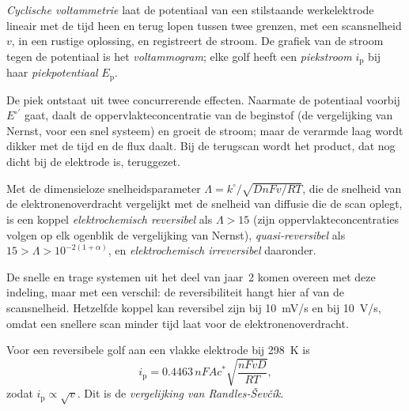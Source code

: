 \begin{definition}\label{def:b3:electrode-kinetics:cv}
\emph{Cyclische voltammetrie} laat de
potentiaal van een stilstaande werkelektrode lineair met de tijd heen en
terug lopen tussen twee grenzen, met een scansnelheid $v$, in een rustige
oplossing, en registreert de stroom. De grafiek van de stroom tegen de
potentiaal is het \emph{voltammogram}; elke golf heeft
een \emph{piekstroom} $i_{\mathrm p}$ bij haar
\emph{piekpotentiaal}
$E_{\mathrm p}$.
\end{definition}

De piek ontstaat uit twee concurrerende effecten. Naarmate de potentiaal
voorbij $E^{\circ\prime}$ gaat, daalt de oppervlakteconcentratie van de
beginstof (de vergelijking van Nernst, voor een snel systeem) en groeit
de stroom; maar de verarmde laag wordt dikker met de tijd en de flux
daalt. Bij de terugscan wordt het product, dat nog dicht bij de
elektrode is, teruggezet.

\begin{definition}[Reversibiliteit]\label{def:b3:electrode-kinetics:reversibility}
Met de dimensieloze snelheidsparameter $\Lambda = k^\circ/\sqrt{DnFv/RT}$,
die de snelheid van de elektronenoverdracht vergelijkt met de snelheid
van diffusie die de scan oplegt, is een koppel
\emph{elektrochemisch reversibel}
als $\Lambda > 15$ (zijn oppervlakteconcentraties volgen op elk ogenblik de
vergelijking van Nernst),
\emph{quasi-reversibel} als $15 >
\Lambda > 10^{-2(1 + \alpha)}$, en
\emph{elektrochemisch irreversibel}
daaronder.
\end{definition}

\begin{remark}
De snelle en trage systemen uit het deel van jaar~2 komen overeen met deze
indeling, maar met een verschil: de reversibiliteit hangt hier af van de
scansnelheid. Hetzelfde koppel kan reversibel zijn bij \qty{10}{mV/s} en
 bij
\qty{10}{V/s}, omdat een snellere scan minder tijd laat voor de
elektronenoverdracht.
\end{remark}

\begin{proposition}\label{prop:b3:electrode-kinetics:randles-sevcik}
Voor een reversibele golf aan een vlakke elektrode bij \qty{298}{K} is
\[
  i_{\mathrm p} = 0.4463\,nFAc^*\sqrt{\frac{nFvD}{RT}},
\]
zodat $i_{\mathrm p} \propto \sqrt v$. Dit is de \emph{vergelijking van
Randles-Ševčík}.
\end{proposition}

